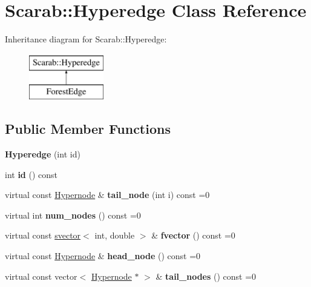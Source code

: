 \hypertarget{classScarab_1_1Hyperedge}{
\section{Scarab::Hyperedge Class Reference}
\label{classScarab_1_1Hyperedge}
}
Inheritance diagram for Scarab::Hyperedge:\begin{figure}[H]
\begin{center}
\leavevmode
\includegraphics[height=2cm]{classScarab_1_1Hyperedge}
\end{center}
\end{figure}
\subsection*{Public Member Functions}
\begin{DoxyCompactItemize}
\item 
\hypertarget{classScarab_1_1Hyperedge_a4a2ac5f6b663137a42aae839830f7f3f}{
{\bfseries Hyperedge} (int id)}
\label{classScarab_1_1Hyperedge_a4a2ac5f6b663137a42aae839830f7f3f}

\item 
\hypertarget{classScarab_1_1Hyperedge_a2306128b0faeb961212d0f7f50df030a}{
int {\bfseries id} () const }
\label{classScarab_1_1Hyperedge_a2306128b0faeb961212d0f7f50df030a}

\item 
\hypertarget{classScarab_1_1Hyperedge_aff40ec04bb111347fbcf923f6f4c0cc5}{
virtual const \hyperlink{classScarab_1_1Hypernode}{Hypernode} \& {\bfseries tail\_\-node} (int i) const =0}
\label{classScarab_1_1Hyperedge_aff40ec04bb111347fbcf923f6f4c0cc5}

\item 
\hypertarget{classScarab_1_1Hyperedge_a39b864da3edd971a6c2cf544ff53dfb6}{
virtual int {\bfseries num\_\-nodes} () const =0}
\label{classScarab_1_1Hyperedge_a39b864da3edd971a6c2cf544ff53dfb6}

\item 
\hypertarget{classScarab_1_1Hyperedge_a425bd3d28dcff146b5320bd5faa958ea}{
virtual const \hyperlink{classsvector}{svector}$<$ int, double $>$ \& {\bfseries fvector} () const =0}
\label{classScarab_1_1Hyperedge_a425bd3d28dcff146b5320bd5faa958ea}

\item 
\hypertarget{classScarab_1_1Hyperedge_a0216004ee220efcbf1fc7fbb1f67d265}{
virtual const \hyperlink{classScarab_1_1Hypernode}{Hypernode} \& {\bfseries head\_\-node} () const =0}
\label{classScarab_1_1Hyperedge_a0216004ee220efcbf1fc7fbb1f67d265}

\item 
\hypertarget{classScarab_1_1Hyperedge_a12f5f3f4f663b72123cca78707e3b67b}{
virtual const vector$<$ \hyperlink{classScarab_1_1Hypernode}{Hypernode} $\ast$ $>$ \& {\bfseries tail\_\-nodes} () const =0}
\label{classScarab_1_1Hyperedge_a12f5f3f4f663b72123cca78707e3b67b}

\end{DoxyCompactItemize}
